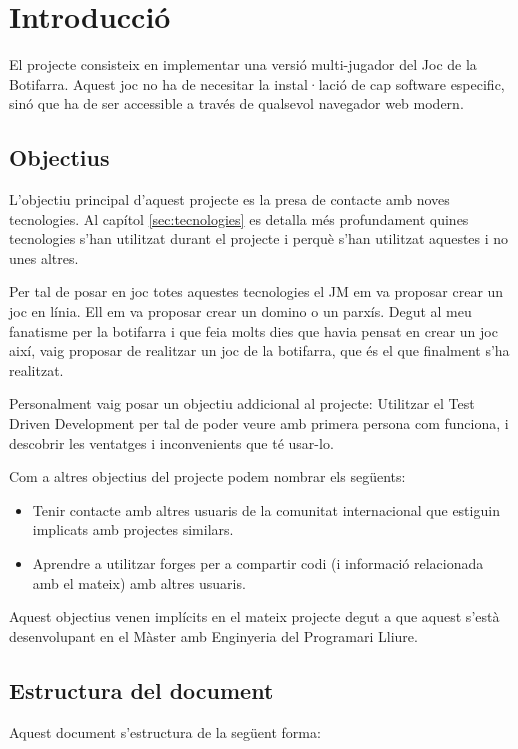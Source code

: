 \chapter{Introducció}

El projecte consisteix en implementar una versió multi-jugador del Joc de la Botifarra. Aquest joc no ha de necesitar la instal·lació de cap software especific, sinó que ha de ser accessible a través de qualsevol navegador web modern.

\section{Objectius}
L'objectiu principal d'aquest projecte es la presa de contacte amb noves tecnologies. Al capítol \ref{sec:tecnologies} es detalla més profundament quines tecnologies s'han utilitzat durant el projecte i perquè s'han utilitzat aquestes i no unes altres. 

Per tal de posar en joc totes aquestes tecnologies el JM em va proposar crear un joc en línia. Ell em va proposar crear un domino o un parxís. Degut al meu fanatisme per la botifarra i que feia molts dies que havia pensat en crear un joc així, vaig proposar de realitzar un joc de la botifarra, que és el que finalment s'ha realitzat. 

Personalment vaig posar un objectiu addicional al projecte: Utilitzar el Test Driven Development per tal de poder veure amb primera persona com funciona, i descobrir les ventatges i inconvenients que té usar-lo. 

Com a altres objectius del projecte podem nombrar els següents: 
\begin{itemize}
	\item{Tenir contacte amb altres usuaris de la comunitat internacional que estiguin implicats amb projectes similars.}
	\item{Aprendre a utilitzar forges per a compartir codi (i informació relacionada amb el mateix) amb altres usuaris.}
\end{itemize} 

Aquest objectius venen implícits en el mateix projecte degut a que aquest s'està desenvolupant en el Màster amb Enginyeria del Programari Lliure. 

\section{Estructura del document}

Aquest document s'estructura de la següent forma: 

